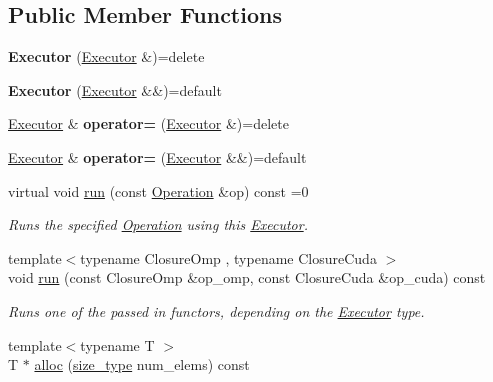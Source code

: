 \subsection*{Public Member Functions}
\begin{DoxyCompactItemize}
\item 
\mbox{\label{classgko_1_1Executor_a4d564aa4d197e1cd8a563b611d3ea8dc}} 
{\bfseries Executor} (\hyperlink{classgko_1_1Executor}{Executor} \&)=delete
\item 
\mbox{\label{classgko_1_1Executor_a00faff4350dd1227d6239e7820e1005c}} 
{\bfseries Executor} (\hyperlink{classgko_1_1Executor}{Executor} \&\&)=default
\item 
\mbox{\label{classgko_1_1Executor_a4560be68217900e62c7ee257daff3d5d}} 
\hyperlink{classgko_1_1Executor}{Executor} \& {\bfseries operator=} (\hyperlink{classgko_1_1Executor}{Executor} \&)=delete
\item 
\mbox{\label{classgko_1_1Executor_a76b9c265cee1598df90f2189feb8dc53}} 
\hyperlink{classgko_1_1Executor}{Executor} \& {\bfseries operator=} (\hyperlink{classgko_1_1Executor}{Executor} \&\&)=default
\item 
virtual void \hyperlink{classgko_1_1Executor_a1de8e2668b76e66690acf5eef9e8324d}{run} (const \hyperlink{classgko_1_1Operation}{Operation} \&op) const =0
\begin{DoxyCompactList}\small\item\em Runs the specified \hyperlink{classgko_1_1Operation}{Operation} using this \hyperlink{classgko_1_1Executor}{Executor}. \end{DoxyCompactList}\item 
{\footnotesize template$<$typename Closure\+Omp , typename Closure\+Cuda $>$ }\\void \hyperlink{classgko_1_1Executor_a62cd3749291cf73a594a931a2b47ac53}{run} (const Closure\+Omp \&op\+\_\+omp, const Closure\+Cuda \&op\+\_\+cuda) const
\begin{DoxyCompactList}\small\item\em Runs one of the passed in functors, depending on the \hyperlink{classgko_1_1Executor}{Executor} type. \end{DoxyCompactList}\item 
{\footnotesize template$<$typename T $>$ }\\T $\ast$ \hyperlink{classgko_1_1Executor_a5a216c2b1f7ceb8a0190c08941c1c687}{alloc} (\hyperlink{namespacegko_a6e5c95df0ae4e47aab2f604a22d98ee7}{size\+\_\+type} num\+\_\+elems) const

\end{DoxyCompactItemize}
